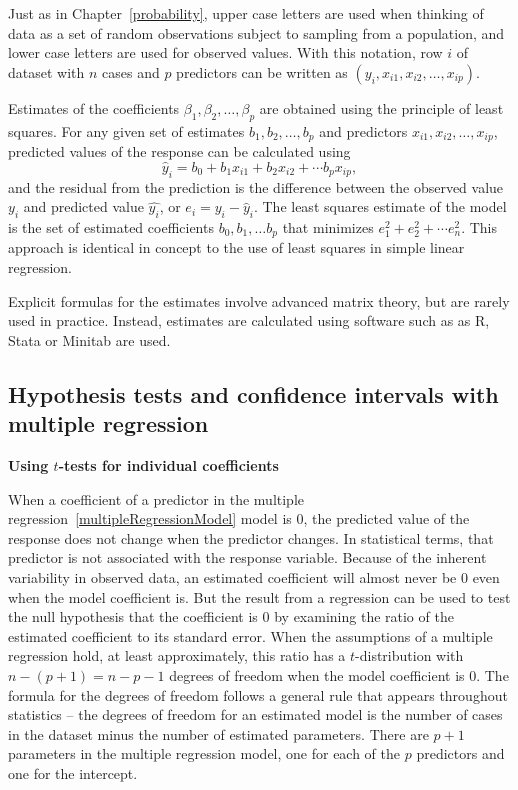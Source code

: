 Just as in Chapter~\ref{probability}, upper case letters are used when thinking of data as a set of random observations subject to sampling from a population, and lower case letters are used for observed values.  With this notation, row $i$ of dataset with $n$ cases and $p$ predictors can be written as $(y_i, x_{i1}, x_{i2}, \ldots, x_{ip})$.

Estimates of the coefficients $\beta_1,\beta_2,\ldots, \beta_p$ are obtained using the principle of least squares.  For any given set of estimates $b_1, b_2,\ldots,b_p$ and predictors $x_{i1},x_{i2},\ldots,x_{ip}$, predicted values of the response can be calculated using
\[
   \hat{y}_i = b_0 + b_1 x_{i1} + b_2 x_{i2} +\cdots b_p x_{ip},
\]
and the residual from the prediction is the difference between the observed value $y_i$ and predicted value $\hat{y_i}$, or $e_i = y_i - \hat{y}_i$.  The least squares estimate of the model is the set of estimated coefficients $b_0, b_1, \ldots b_p$ that minimizes $e_1^2 + e_2^2 + \cdots e_n^2$.  This approach is identical in concept to the use of least squares in simple linear regression.

Explicit formulas for the estimates involve advanced matrix theory, but are rarely used in practice.  Instead, estimates are calculated using software such as as \textsf{R}, Stata or Minitab are used.

\subsection{Hypothesis tests and confidence intervals with multiple regression}

\textbf{Using $t$-tests for individual coefficients}

When a coefficient of a predictor in the multiple regression~\ref{multipleRegressionModel} model is 0, the predicted value of the response does not change when the predictor changes.  In statistical terms, that predictor is not associated with the response variable.  Because of the inherent variability in observed data, an estimated coefficient will almost never be 0 even when the model coefficient is.  But the result from a regression can be used to test the null hypothesis that the coefficient is 0 by examining the ratio of the estimated coefficient to its standard error.  When the assumptions of a multiple regression hold, at least approximately, this ratio has a $t$-distribution with $n - (p + 1) =n - p - 1$ degrees of freedom when the model coefficient is 0. The formula for the degrees of freedom follows a general rule that appears throughout statistics -- the degrees of freedom for an estimated model is the number of cases in the dataset minus the number of estimated parameters.  There are $p + 1$ parameters in the multiple regression model, one for each of the $p$ predictors and one for the intercept.

